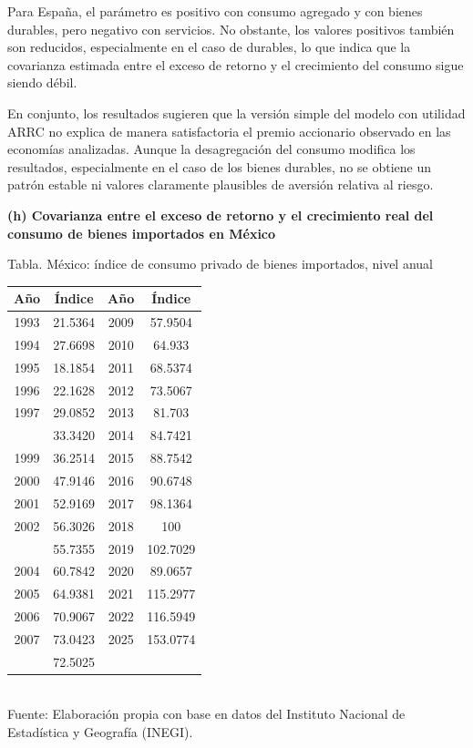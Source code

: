 \documentclass{article}\usepackage[]{graphicx}\usepackage[]{xcolor}
\begin{document}
Para España, el parámetro es positivo con consumo agregado y con bienes durables, pero negativo con servicios. No obstante, los valores positivos también son reducidos, especialmente en el caso de durables, lo que indica que la covarianza estimada entre el exceso de retorno y el crecimiento del consumo sigue siendo débil.

En conjunto, los resultados sugieren que la versión simple del modelo con utilidad ARRC no explica de manera satisfactoria el premio accionario observado en las economías analizadas. Aunque la desagregación del consumo modifica los resultados, especialmente en el caso de los bienes durables, no se obtiene un patrón estable ni valores claramente plausibles de aversión relativa al riesgo.

\newpage
\textbf{(h) Covarianza entre el exceso de retorno y el crecimiento real del consumo de bienes importados en México}



\begin{center}
Tabla. México: índice de consumo privado de bienes importados, nivel anual
\end{center}
\begin{center}

\begin{tabular}{cccc}
\toprule
Año & Índice & Año & Índice\\
\midrule
1993 & 21.5364 & 2009 & 57.9504\\
1994 & 27.6698 & 2010 & 64.933\\
1995 & 18.1854 & 2011 & 68.5374\\
1996 & 22.1628 & 2012 & 73.5067\\
1997 & 29.0852 & 2013 & 81.703\\
\addlinespace
1998 & 33.3420 & 2014 & 84.7421\\
1999 & 36.2514 & 2015 & 88.7542\\
2000 & 47.9146 & 2016 & 90.6748\\
2001 & 52.9169 & 2017 & 98.1364\\
2002 & 56.3026 & 2018 & 100\\
\addlinespace
2003 & 55.7355 & 2019 & 102.7029\\
2004 & 60.7842 & 2020 & 89.0657\\
2005 & 64.9381 & 2021 & 115.2977\\
2006 & 70.9067 & 2022 & 116.5949\\
2007 & 73.0423 & 2025 & 153.0774\\
\addlinespace
2008 & 72.5025 &  & \\
\bottomrule
\end{tabular}
\\[0.3em]
{\footnotesize Fuente: Elaboración propia con base en datos del Instituto Nacional de Estadística y Geografía (INEGI).}
\end{center}
\end{document}
